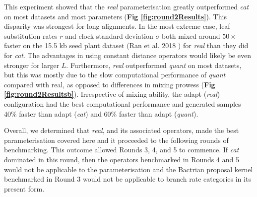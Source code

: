 \documentclass[10pt,letterpaper]{article}
\begin{document}
This experiment showed that the \textit{real} parameterisation greatly outperformed \textit{cat} on most datasets and most parameters (\textbf{Fig \ref{fig:round2Results}}).
This disparity was strongest for long alignments.
In the most extreme case, leaf substitution rates $r$ and clock standard deviation $\sigma$ both mixed around $50\times$ faster on the 15.5 kb seed plant dataset (Ran et al. 2018 \cite{Ran_2018}) for \textit{real} than they did for \textit{cat}.
The advantages in using constant distance operators would likely be even stronger for larger $L$.
Furthermore, \textit{real} outperformed \textit{quant} on most datasets, but this was mostly due to the slow computational performance of \textit{quant} compared with real, as opposed to differences in mixing prowess (\textbf{Fig \ref{fig:round2Resultsb}}).
Irrespective of mixing ability, the adapt (\textit{real}) configuration had the best computational performance and generated samples 40\% faster than adapt (\textit{cat}) and 60\% faster than adapt (\textit{quant}).


Overall, we determined that \textit{real}, and its associated operators, made the best parameterisation covered here and it proceeded to the following rounds of benchmarking.
This outcome allowed Rounds 3, 4, and 5 to commence. 
If \textit{cat} dominated in this round, then the operators benchmarked in Rounds 4 and 5 would not be applicable to the parameterisation and the Bactrian proposal kernel benchmarked in Round 3 would not be applicable to branch rate categories in its present form.
\end{document}
